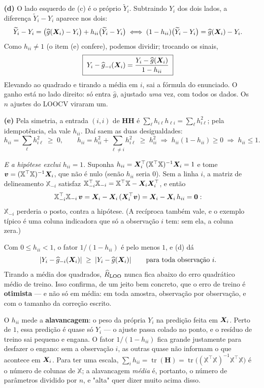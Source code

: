 \begin{solucao}
\smallskip
\textbf{(d)} O lado esquerdo de (c) é o próprio $\widetilde Y_i$. Subtraindo $Y_i$ dos
dois lados, a diferença $\widetilde Y_i-Y_i$ aparece nos dois:
\[
  \widetilde Y_i-Y_i=\big(\widehat g(\bm{X}_i)-Y_i\big)+h_{ii}\big(\widetilde Y_i-Y_i\big)
  \iff
  (1-h_{ii})\big(\widetilde Y_i-Y_i\big)=\widehat g(\bm{X}_i)-Y_i .
\]
Como $h_{ii}\neq1$ (o item (e) confere), podemos dividir; trocando os sinais,
\[
  \boxed{\;Y_i-\widehat g_{-i}(\bm{X}_i)=\frac{Y_i-\widehat g(\bm{X}_i)}{1-h_{ii}}\;}
\]
Elevando ao quadrado e tirando a média em $i$, sai a fórmula do enunciado. O ganho está
no lado direito: só entra $\widehat g$, ajustado \emph{uma} vez, com todos os dados. Os
$n$ ajustes do LOOCV viraram um.

\smallskip
\textbf{(e)} Pela simetria, a entrada $(i,i)$ de $\bm H\bm H$ é
$\sum_\ell h_{i\ell}h_{\ell i}=\sum_\ell h_{i\ell}^2$; pela idempotência, ela vale
$h_{ii}$. Daí saem as duas desigualdades:
\[
  h_{ii}=\sum_\ell h_{i\ell}^2\;\ge\;0,
  \qquad
  h_{ii}=h_{ii}^2+\sum_{\ell\neq i}h_{i\ell}^2\;\ge\;h_{ii}^2
  \;\Longrightarrow\;h_{ii}(1-h_{ii})\ge0
  \;\Longrightarrow\;h_{ii}\le1 .
\]

\emph{E a hipótese exclui $h_{ii}=1$.} Suponha $h_{ii}=\bm{X}_i^\top(\mathbb{X}^\top\mathbb{X})^{-1}\bm{X}_i=1$
e tome $\bm v=(\mathbb{X}^\top\mathbb{X})^{-1}\bm{X}_i$, que não é nulo (senão $h_{ii}$ seria
$0$). Sem a linha $i$, a matriz de delineamento $\mathbb{X}_{-i}$ satisfaz
$\mathbb{X}_{-i}^\top\mathbb{X}_{-i}=\mathbb{X}^\top\mathbb{X}-\bm{X}_i\bm{X}_i^\top$, e então
\[
  \mathbb{X}_{-i}^\top\mathbb{X}_{-i}\,\bm v=\bm{X}_i-\bm{X}_i\,(\bm{X}_i^\top\bm v)=\bm{X}_i-\bm{X}_i\,h_{ii}=\bm0 :
\]
$\mathbb{X}_{-i}$ perderia o posto, contra a hipótese. (A recíproca também vale, e o
exemplo típico é uma coluna indicadora que só a observação $i$ tem: sem ela, a coluna
zera.)

Com $0\le h_{ii}<1$, o fator $1/(1-h_{ii})$ é pelo menos $1$, e (d) dá
\[
  \left\lvert Y_i-\widehat g_{-i}(\bm{X}_i) \right\rvert\;\ge\;\left\lvert Y_i-\widehat g(\bm{X}_i) \right\rvert
  \qquad\text{para toda observação } i .
\]
Tirando a média dos quadrados, $\widehat{R}_{\text{LOO}}$ nunca fica abaixo do erro
quadrático médio de treino. Isso confirma, de um jeito bem concreto, que o erro de
treino é \textbf{otimista} --- e não só em média: em toda amostra, observação por
observação, e com o tamanho da correção escrito.

O $h_{ii}$ mede a \textbf{alavancagem}: o peso da própria $Y_i$ na predição feita em
$\bm{X}_i$. Perto de $1$, essa predição é quase só $Y_i$ --- o ajuste passa colado no
ponto, e o resíduo de treino sai pequeno e engana. O fator $1/(1-h_{ii})$ fica grande
justamente para desfazer o engano: sem a observação $i$, as outras quase não informam
o que acontece em $\bm{X}_i$. Para ter uma escala,
$\sum_ih_{ii}=\operatorname{tr}(\bm H)=\operatorname{tr}\big((\mathbb{X}^\top\mathbb{X})^{-1}\mathbb{X}^\top\mathbb{X}\big)$
é o número de colunas de $\mathbb{X}$; a alavancagem \emph{média} é, portanto, o número
de parâmetros dividido por $n$, e "alta" quer dizer muito acima disso.


\end{solucao}
